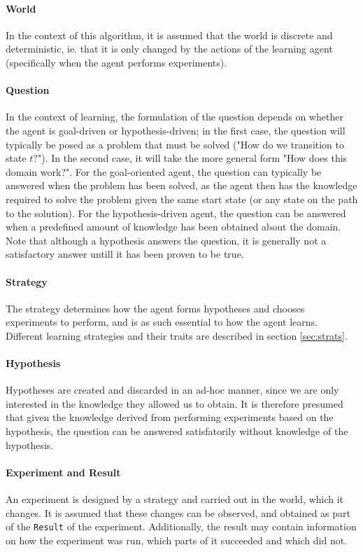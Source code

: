 \documentclass[../Master.tex]{subfiles}
\begin{document}
\paragraph*{World}
In the context of this algorithm, it is assumed that the world is discrete and deterministic, ie. that it is only changed by the actions of the learning agent (specifically when the agent performs experiments).

\paragraph*{Question}
In the context of learning, the formulation of the question depends on whether the agent is goal-driven or hypothesis-driven; in the first case, the question will typically be posed as a problem that must be solved ("How do we transition to state $t$?"). In the second case, it will take the more general form "How does this domain work?".
For the goal-oriented agent, the question can typically be answered when the problem has been solved, as the agent then has the knowledge required to solve the problem given the same start state (or any state on the path to the solution). For the hypothesis-driven agent, the question can be answered when a predefined amount of knowledge has been obtained about the domain. Note that although a hypothesis answers the question, it is generally not a satisfactory answer untill it has been proven to be true.

\paragraph*{Strategy}
The strategy determines how the agent forms hypotheses and chooses experiments to perform, and is as such essential to how the agent learns. Different learning strategies and their traits are described in section \ref{sec:strats}.

\paragraph*{Hypothesis}
Hypotheses are created and discarded in an ad-hoc manner, since we are only interested in the knowledge they allowed us to obtain. It is therefore presumed that given the knowledge derived from performing experiments based on the hypothesis, the question can be answered satisfatorily without knowledge of the hypothesis.

\paragraph*{Experiment and Result}
An experiment is designed by a strategy and carried out in the world, which it changes. It is assumed that these changes can be observed, and obtained as part of the \texttt{Result} of the experiment. Additionally, the result may contain information on how the experiment was run, which parts of it succeeded and which did not.
\end{document}
